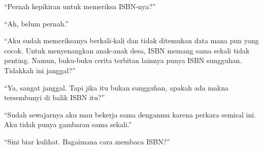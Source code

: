 \documentclass[smalldemyvopaper,11pt,twoside,onecolumn,openright,extrafontsizes]{memoir}
\begin{document}
``Pernah kepikiran untuk memeriksa ISBN-nya?''

``Ah, belum pernah.''

``Aku sudah memeriksanya berkali-kali dan tidak ditemukan data mana pun yang cocok. Untuk menyenangkan anak-anak desa, ISBN memang sama sekali tidak penting. Namun, buku-buku cerita terbitan lainnya punya ISBN sungguhan. Tidakkah ini janggal?''

``Ya, sangat janggal. Tapi jika itu bukan sungguhan, apakah ada makna tersembunyi di balik ISBN itu?''

``Sudah sewajarnya aku mau bekerja sama denganmu karena perkara semisal ini. Aku tidak punya gambaran sama sekali.''

``Sini biar kulihat. Bagaimana cara membaca ISBN?''






\end{document}
